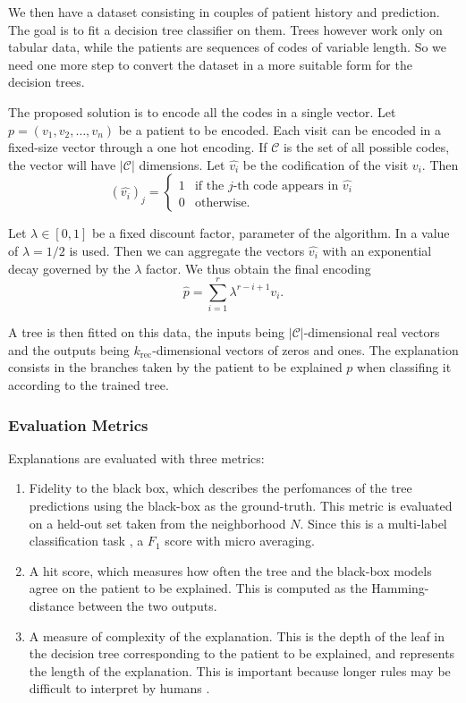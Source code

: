 \documentclass[]{marticle}
\newcommand{\codes}{\mathcal{C}}
\begin{document}
We then have a dataset consisting in couples of patient history and prediction. The goal is to fit a
decision tree classifier on them. Trees however work only on tabular data, while the patients are
sequences of codes of variable length. So we need one more step to convert the dataset in a more
suitable form for the decision trees.

The proposed solution is to encode all the codes in a single vector. Let $p=(v_1, v_2, \dots, v_n)$
be a patient to be encoded. Each visit can be encoded in a fixed-size vector through a one hot
encoding. If $\codes$ is the set of all possible codes, the vector will have $|\codes|$ dimensions.
Let $\hat{v_i}$ be the codification of the visit $v_i$. Then
\begin{equation*}
    (\hat{v_i})_j = \begin{cases}
        1 &\text{if the $j$-th code appears in $\hat{v_i}$}  \\
        0 &\text{otherwise}.
    \end{cases}
\end{equation*}

Let $\lambda\in [0,1]$ be a fixed discount factor, parameter of the algorithm. In
\cite{panigutti-xai} a value of $\lambda = 1/2$ is used. Then we can aggregate the vectors
$\hat{v_i}$ with an exponential decay governed by the $\lambda$ factor. We thus obtain the final
encoding
\begin{equation*}
    \hat{p} = \sum_{i=1}^r \lambda^{r-i+1} v_i.
\end{equation*}

A tree is then fitted on this data, the inputs being $|\codes|$-dimensional real vectors and the
outputs being $k_\text{rec}$-dimensional vectors of zeros and ones. The explanation consists in the
branches taken by the patient to be explained $p$ when classifing it according to the trained tree.

\subsubsection{Evaluation Metrics}

Explanations are evaluated with three metrics:
\begin{enumerate}
\item Fidelity to the black box, which describes the perfomances of the tree predictions using the
black-box as the ground-truth. This metric is evaluated on a held-out set taken from the
neighborhood $N$. Since this is a multi-label classification task \cite{paper-multi-label}, a $F_1$
score with micro averaging.

\item A hit score, which measures how often the tree and the black-box models agree on the patient
to be explained. This is computed as the Hamming-distance between the two outputs.

\item A measure of complexity of the explanation. This is the depth of the leaf in the decision tree
corresponding to the patient to be explained, and represents the length of the explanation. This is
important because longer rules may be difficult to interpret by humans \cite{paper-lipton}.
\end{enumerate}
\end{document}
